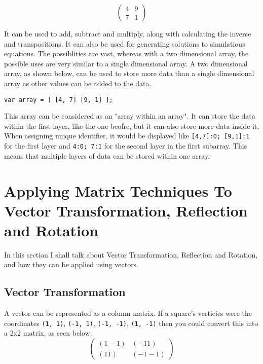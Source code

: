 \documentclass[a4paper,10pt]{article}
\begin{document}
      \begin{equation*}
        \begin{pmatrix}
          4 & 9\\
          7 & 1
        \end{pmatrix}
      \end{equation*}

      It can be used to add, subtract and multiply, along with calculating the inverse and transpositions. It can also be used for generating solutions to simulatious equations. The possiblities are vast, whereas with a two dimensional array, the possible uses are very similar to a single dimensional array. A two dimensional array, as shown below, can be used to store more data than a single dimensional array as other values can be added to the data.

      \texttt{var array = [ [4, 7] [9, 1] ];}

      This array can be considered as an "array within an array". It can store the data within the first layer, like the one beofre, but it can also store more data inside it. When assigning unique identifier, it would be displayed like \texttt{[4,7]:0; [9,1]:1} for the first layer and \texttt{4:0; 7:1} for the second layer in the first subarray. This means that multiple layers of data can be stored within one array.

    \newpage

    \section{Applying Matrix Techniques To Vector Transformation, Reflection and Rotation}
      In this section I shall talk about Vector Transformation, Reflection and Rotation, and how they can be applied using vectors.
      \subsection{Vector Transformation}
        A vector can be represented as a column matrix. If a square's verticies were the coordinates \texttt{(1, 1)}, \texttt{(-1, 1)}, \texttt{(-1, -1)}, \texttt{(1, -1)} then you could convert this into a 2x2 matrix, as seen below:
        \begin{equation*}
          \begin{pmatrix}
            (1 -1) & (-1  1)\\(1  1) & (-1 -1)
          \end{pmatrix}
        \end{equation*}
\end{document}
